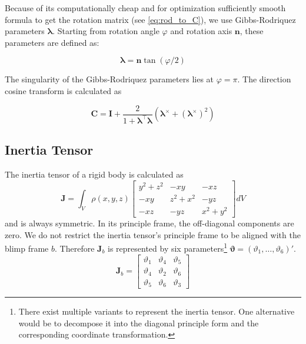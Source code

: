 Because of its computationally cheap and for optimization sufficiently smooth formula to get the rotation matrix (see \cref{eq:rod_to_C}), we use Gibbs-Rodriquez parameters $\boldsymbol{\lambda}$. Starting from rotation angle $\varphi$ and rotation axis $\mathbf{n}$, these parameters are defined as:

\begin{equation}
\boldsymbol{\lambda} = \mathbf{n} \tan(\varphi/2) 
\end{equation}

The singularity of the Gibbs-Rodriquez parameters lies at $\varphi = \pi$. 
The direction cosine transform is calculated as

\begin{equation}
\label{eq:rod_to_C}
\mathbf{C} = \mathbf{I} + \frac{2}{1+\boldsymbol{\lambda}^\top \boldsymbol{\lambda}}
\left(\boldsymbol{\lambda}^\times + \left(\boldsymbol{\lambda}^\times\right)^2\right)
\end{equation}

\subsection{Inertia Tensor}
\label{sub:par_inertia}
The inertia tensor of a rigid body is calculated as
\begin{equation}
\mathbf{J} = \int_V \rho(x,y,z) 
\left[ \begin{array}{ccc}
y^2+z^2 & - xy    & - xz \\
- xy    & z^2+x^2 & - yz \\
- xz    & - yz    & x^2+y^2
\end{array} \right] dV
\end{equation}
and is always symmetric.
In its principle frame, the off-diagonal components are zero.
We do not restrict the inertia tensor's principle frame to be aligned with the blimp frame $b$.
Therefore $\mathbf{J}_b$ is represented by six parameters\footnote{
There exist multiple variants to represent the inertia tensor. One alternative would be to decompose it into the diagonal principle form and the corresponding coordinate transformation.
}
$\boldsymbol{\vartheta} = (\vartheta_1, \hdots, \vartheta_6)'$.
\begin{equation}
\mathbf{J}_b = 
\left[ \begin{array}{ccc}
\vartheta_1 & \vartheta_4 & \vartheta_5 \\
\vartheta_4 & \vartheta_2 & \vartheta_6 \\
\vartheta_5 & \vartheta_6 & \vartheta_3
\end{array} \right]
\end{equation}


